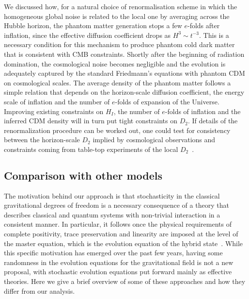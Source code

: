 \documentclass[amsmath,amssymb,11pt]{article}
\begin{document}
We discussed how, for a natural choice of renormalisation scheme in which the homogeneous global noise is related to the local one by averaging across the Hubble horizon, the phantom matter generation stops a few $e$-folds after inflation, since the effective diffusion coefficient drops as $H^3\sim t^{-3}$. This is a necessary condition for this mechanism to produce phantom cold dark matter that is consistent with CMB constraints. Shortly after the beginning of radiation domination, the cosmological noise becomes negligible and the evolution is adequately captured by the standard Friedmann's equations with phantom CDM on cosmological scales. The average density of the phantom matter follows a simple relation that depends on the horizon-scale diffusion coefficient, the energy scale of inflation and the number of $e$-folds of expansion of the Universe. Improving existing constraints on $H_I$, the number of $e$-folds of inflation and the inferred CDM density will in turn put tight constraints on $D_2$. If details of the renormalization procedure can be worked out, one could test for consistency between the horizon-scale $D_2$ implied by cosmological observations and constraints coming from table-top experiments of the local $D_2$~\cite{oppenheim2023gravitationally}.

\subsection{Comparison with other models}
The motivation behind our approach is that stochasticity in the classical gravitational degrees of freedom is a necessary consequence of a theory that describes classical and quantum systems with non-trivial interaction in a consistent manner. In particular, it follows once the physical requirements of complete positivity, trace preservation and linearity are imposed at the level of the master equation, which is the evolution equation of the hybrid state~\cite{oppenheim2021postquantum,oppenheim2022classes}. While this specific motivation has emerged over the past few years, having some randomness in the evolution equations for the gravitational field is not a new proposal, with stochastic evolution equations put forward mainly as effective theories. Here we give a brief overview of some of these approaches and how they differ from our analysis.
\end{document}
